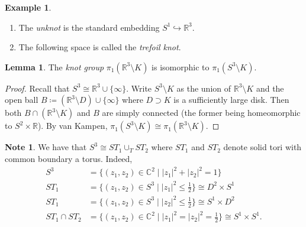 \documentclass[10pt,letterpaper,cm]{nupset}
\theoremstyle{definition}
\newtheorem{exmp}[definition]{Example}
\newtheorem{note}[definition]{Note}
\theoremstyle{theorem}
\newtheorem{lemma}[definition]{Lemma}
\theoremstyle{remark}
\newcommand{\C}{\mathbb C}
\newcommand{\R}{\mathbb{R}}
\newcommand{\1}{\mathbb{1}}
\newcommand{\0}{\vec 0}
\begin{document}
\begin{exmp} $ $
\begin{enumerate}
\item The \textit{unknot} is the standard embedding $S^1 \hookrightarrow \R^3$. 
\item The following space is called the \textit{trefoil knot}.

\end{enumerate}
\end{exmp}

\begin{lemma}
The \textit{knot group} $ \pi_1(\R^3 \setminus K)$ is isomorphic to $\pi_1(S^3 \setminus K)$. 
\end{lemma}
\begin{proof}
Recall that $S^3 \cong \R^3 \cup \{\infty\}$. Write $S^3 \setminus K$ as the union of $\R^3 \setminus K$ and the open ball $B\coloneqq  (\R^3 \setminus D) \cup \{\infty\}$ where $D\supset K$ is a sufficiently large disk. Then both $B \cap (\R^3 \setminus K)$ and $B$ are simply connected (the former being homeomorphic to $S^2 \times \R$). By van Kampen, $\pi_1(S^3 \setminus K) \cong \pi_1(\R^3 \setminus K)$. 
\end{proof}

\begin{note}
We have that $S^3 \cong ST_1 \cup_T ST_2$ where $ST_1$ and $ST_2$ denote solid tori with common boundary a torus. Indeed, 
\begin{align*}
 S^3 & = \{(z_1, z_2) \in \C^2 \mid |z_1|^2 + |z_2|^2 =1\}
\\  ST_1 &= \{(z_1, z_2) \in S^3 \mid |z_1|^2 \leq \frac{1}{2} \} \cong D^2 \times S^1
\\  ST_1 &= \{(z_1, z_2) \in S^3 \mid |z_2|^2 \leq \frac{1}{2} \} \cong S^1 \times D^2
\\  ST_1 \cap ST_2 &= \{(z_1, z_2)\in \C^2 \mid |z_1|^2 = |z_2|^2 = \frac{1}{2} \} \cong S^1\times S^1
.\end{align*}
\end{note}
\end{document}
